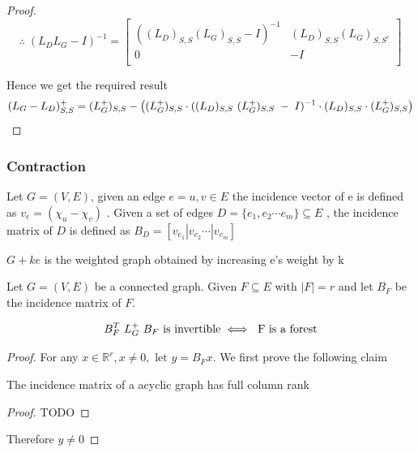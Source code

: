 \begin{proof}
$$\therefore \; (L_DL_G - I)^{-1} = 
\begin{bmatrix}
((L_D)_{S,S} (L_G)_{S,S} - I)^{-1} & (L_D)_{S,S}(L_G)_{S,S^c} \\
0 & -I \\
\end{bmatrix}
$$

Hence we get the required result 
  $$ (L_G - L_D)_{S,S}^+ = (L_{G}^{+})_{S,S} - \left( (L_{G}^{+})_{S,S} \cdot ((L_D)_{S,S} \  (L_{G}^{+})_{S,S} \; - \; I)^{-1} \cdot (L_D)_{S,S} \cdot (L_{G}^{+})_{S,S} \right) $$ 
  
\end{proof}


\subsubsection{Contraction}


\begin{HXd}
Let $G = (V,E)$, given an edge $e = {u,v} \in E$ the incidence vector of e is defined as $v_e = (\chi_u - \chi_v)$ . Given a set of edges $D = \{e_1, e_2 \cdots e_m\} \subseteq E$ , the incidence matrix of $D$ is defined as $B_D = [v_{e_1} | v_{e_2} \cdots | v_{e_m}]$  
\end{HXd}

\begin{HXd}[$G + ke$]
 $G + ke$ is the weighted graph obtained by increasing e's weight by k
\end{HXd}


\begin{HXl}
 Let $G = (V, E)$ be a connected graph. Given $F \subseteq E$ with $|F| = r$ and let $B_F$ be the incidence matrix of $F$.
 
 $$ B_F^T \ L_{G}^{+} \ B_F \ \text{is invertible} \iff \text{ F is a forest} $$
\end{HXl}

\begin{proof}
 For any $x \in \mathbb{R}^r, x \neq 0, \text{ let } y = B_F x$. We first prove the following claim
 
 \begin{HXcl}
  The incidence matrix of a acyclic graph has full column rank
 \end{HXcl}
    \begin{proof}
    TODO
    \end{proof}
    
Therefore $y \neq 0$
 
\end{proof}


